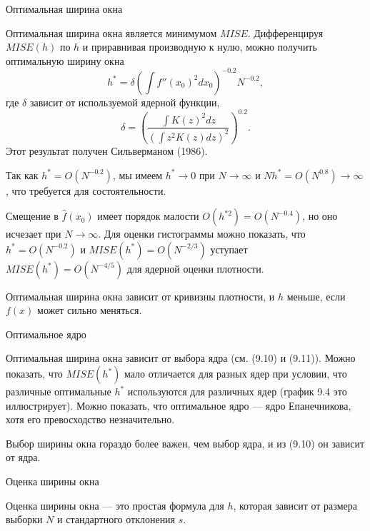 \begin{center}
Оптимальная ширина окна
\end{center}

Оптимальная ширина окна является минимумом $MISE$. Дифференцируя $MISE(h)$ по $h$ и приравнивая производную к нулю, можно получить оптимальную ширину окна
\begin{equation}
h^* = \delta \left( \int f''(x_0)^2 dx_0 \right)^{-0.2} N^{-0.2},
\end{equation}
где $\delta$ зависит от используемой ядерной функции,
\begin{equation}
\delta = \left( \frac{\int K(z)^2dz}{(\int z^2K(z)dz)^2} \right)^{0.2}.
\end{equation}
Этот результат получен Сильверманом (1986).

Так как $h^* = O(N^{-0.2})$, мы имеем $h^* \rightarrow 0 $ при $N \rightarrow \infty$ и $Nh^* = O(N^{0.8}) \rightarrow \infty$, что требуется для состоятельности.

Смещение в $\hat{f}(x_0)$ имеет порядок малости $O(h^{*2}) = O(N^{-0.4})$, но оно исчезает при $N \rightarrow \infty$. Для оценки гистограммы можно показать, что $h^* = O(N^{-0.2})$ и $MISE(h^*) = O(N^{-2/3})$ уступает  $MISE(h^*) = O(N^{-4/5})$ для ядерной оценки плотности.

Оптимальная ширина окна зависит от кривизны плотности, и $h$ меньше, если $f(x)$ может сильно меняться.

\begin{center}
Оптимальное ядро
\end{center}

Оптимальная ширина окна зависит от выбора ядра (см. (9.10) и (9.11)). Можно показать, что $MISE(h^*)$ мало отличается для  разных ядер при условии, что различные оптимальные $h^*$ используются для различных ядер (график 9.4 это иллюстрирует). Можно показать, что оптимальное ядро --- ядро Епанечникова, хотя его превосходство незначительно.

Выбор ширины окна гораздо более важен, чем выбор ядра, и из (9.10) он зависит от ядра.

\begin{center}
Оценка ширины окна 
\end{center}

Оценка ширины окна --- это простая формула для $h$, которая зависит от размера выборки $N$ и стандартного отклонения $s$.

